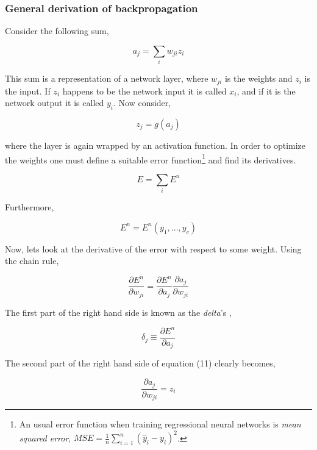 \documentclass[12pt, letterpaper]{amsart}%
\begin{document}
\subsubsection{General derivation of backpropagation}
Consider the following sum,

\begin{equation}
    a_j = \sum_i w_{ji}z_i
\end{equation}

This sum is a representation of a network layer, where $w_{ji}$ is the weights and $z_i$ is the input. If $z_i$ happens to be the network input it is called $x_i$, and if it is the network output it is called $y_i$. Now consider,

\begin{equation}
    z_j = g(a_j)
\end{equation}

where the layer is again wrapped by an activation function. In order to optimize the weights one must define a suitable error function\footnote{An usual error function when training regressional neural networks is \textit{mean squared error}, $MSE = \frac{1}{n} \sum_{i=1}^n (\hat{y}_i - y_i)^2$.} and find its derivatives.

\begin{equation}
    E = \sum_i E^n
\end{equation}

Furthermore, 

\begin{equation}
    E^n = E^n(y_1,...,y_c)
\end{equation}

Now, lets look at the derivative of the error with respect to some weight. Using the chain rule,

\begin{equation}
    \frac{\partial E^n}{\partial w_{ji}} = \frac{\partial E^n}{\partial a_j} \frac{\partial a_j}{\partial w_{ji}}
\end{equation}

The first part of the right hand side is known as the \textit{delta}'s ,

\begin{equation}
    \delta_j \equiv \frac{\partial E^n}{\partial a_j}
\end{equation}

The second part of the right hand side of equation (11) clearly becomes,

\begin{equation}
    \frac{\partial a_j}{\partial w_{ji}} = z_i
\end{equation}
\end{document}
